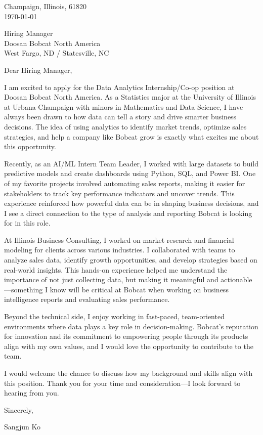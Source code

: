 \documentclass[11pt]{article}
\begin{document}
\noindent
Champaign, Illinois, 61820 \\
\today
\vspace{2em}

\noindent
Hiring Manager \\
Doosan Bobcat North America \\
West Fargo, ND / Statesville, NC

\vspace{1.5em}

Dear Hiring Manager,

I am excited to apply for the Data Analytics Internship/Co-op position at Doosan Bobcat North America. As a Statistics major at the University of Illinois at Urbana-Champaign with minors in Mathematics and Data Science, I have always been drawn to how data can tell a story and drive smarter business decisions. The idea of using analytics to identify market trends, optimize sales strategies, and help a company like Bobcat grow is exactly what excites me about this opportunity.

Recently, as an AI/ML Intern Team Leader, I worked with large datasets to build predictive models and create dashboards using Python, SQL, and Power BI. One of my favorite projects involved automating sales reports, making it easier for stakeholders to track key performance indicators and uncover trends. This experience reinforced how powerful data can be in shaping business decisions, and I see a direct connection to the type of analysis and reporting Bobcat is looking for in this role.

At Illinois Business Consulting, I worked on market research and financial modeling for clients across various industries. I collaborated with teams to analyze sales data, identify growth opportunities, and develop strategies based on real-world insights. This hands-on experience helped me understand the importance of not just collecting data, but making it meaningful and actionable—something I know will be critical at Bobcat when working on business intelligence reports and evaluating sales performance.

Beyond the technical side, I enjoy working in fast-paced, team-oriented environments where data plays a key role in decision-making. Bobcat’s reputation for innovation and its commitment to empowering people through its products align with my own values, and I would love the opportunity to contribute to the team.

I would welcome the chance to discuss how my background and skills align with this position. Thank you for your time and consideration—I look forward to hearing from you.


\vspace{1em}

Sincerely,

\vspace{2em}

Sangjun Ko
\end{document}
